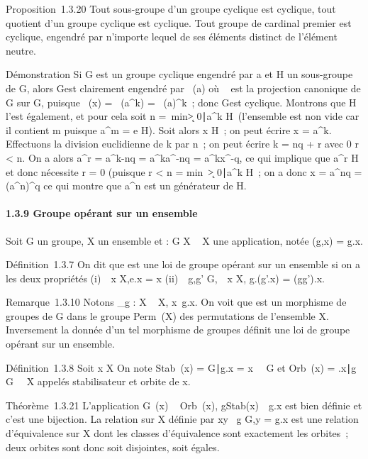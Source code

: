 Proposition~1.3.20 Tout sous-groupe d'un groupe cyclique est cyclique,
tout quotient d'un groupe cyclique est cyclique. Tout groupe de cardinal
premier est cyclique, engendré par n'importe lequel de ses éléments
distinct de l'élément neutre.

Démonstration Si G est un groupe cyclique engendré par a et H un
sous-groupe de G, alors G\diagupH est clairement engendré par \pi~(a) où \pi~ est la
projection canonique de G sur G\diagupH, puisque \pi~(x) = \pi~(a^k) =
\pi~(a)^k~; donc G\diagupH est cyclique. Montrons que H l'est
également, et pour cela soit n =\
min\k >
0∣a^k \in H\
(l'ensemble est non vide car il contient m puisque a^m = e \in
H). Soit alors x \in H~; on peut écrire x = a^k. Effectuons la
division euclidienne de k par n~; on peut écrire k = nq + r avec 0 \leq r
< n. On a alors a^r = a^k-nq =
a^ka^-nq = a^kx^-q, ce qui
implique que a^r \in H et donc nécessite r = 0 (puisque r
< n = min~\k
> 0∣a^k \in
H\)~; on a donc x = a^nq =
(a^n)^q ce qui montre que a^n est un
générateur de H.

\paragraph{1.3.9 Groupe opérant sur un ensemble}

Soit G un groupe, X un ensemble et \phi : G \times X \rightarrow~ X une application, notée
\phi(g,x) = g.x.

Définition~1.3.7 On dit que \phi est une loi de groupe opérant sur un
ensemble si on a les deux propriétés (i)\forall~~x \in
X,e.x = x (ii)\forall~~g,g' \in
G,\forall~~x \in X, g.(g'.x) = (gg').x.

Remarque~1.3.10 Notons \sigma_g : X \rightarrow~ X,
x\mapsto~g.x. On voit que \sigma est un morphisme de
groupes de G dans le groupe Perm~(X) des
permutations de l'ensemble X. Inversement la donnée d'un tel morphisme
de groupes définit une loi de groupe opérant sur un ensemble.

Définition~1.3.8 Soit x \in X On note Stab~(x) =
\g \in G∣g.x =
x\ \subset~ G et Orb~(x) =
\g.x∣g \in G\
\subset~ X appelés stabilisateur et orbite de x.

Théorème~1.3.21 L'application G\diagupStab~(x)
\rightarrow~ Orb~(x),
gStab(x)\mathrel\mapsto~~g.x est
bien définie et c'est une bijection. La relation sur X définie par xy
\Leftrightarrow \exists~g \in G,y = g.x
est une relation d'équivalence sur X dont les classes d'équivalence sont
exactement les orbites~; deux orbites sont donc soit disjointes, soit
égales.

